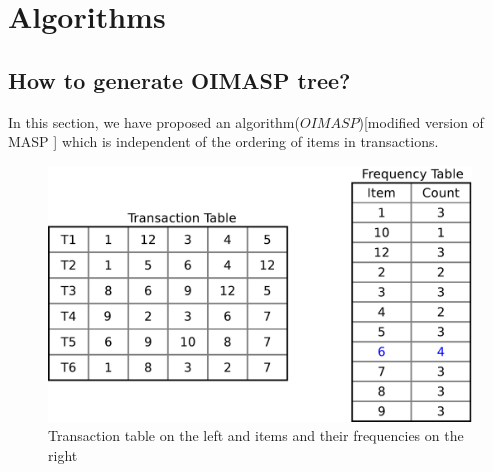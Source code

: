 \documentclass[preprint]{elsarticle}
\begin{document}
\section{Algorithms}

\subsection{How to generate OIMASP tree?}
In this section, we have proposed an algorithm($ OIMASP $)[modified version of MASP \cite{oldmasp}] which is independent of the ordering of items in transactions.

\begin{figure}
\begin{center}
\includegraphics[scale=0.25]{pdf/itemfreq}
\end{center}
\caption{Transaction table on the left and items and their frequencies on the right}
\label{Fig 5}
\end{figure}
\end{document}
